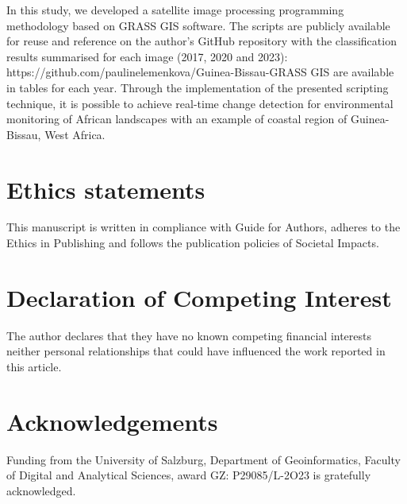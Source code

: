 \documentclass[final,5p,times,twocolumn]{elsarticle}
\begin{document}
In this study, we developed a satellite image processing programming methodology based on GRASS GIS software. The scripts are publicly available for reuse and reference on the author's GitHub repository with the classification results summarised for each image (2017, 2020 and 2023): https://github.com/paulinelemenkova/Guinea-Bissau-GRASS GIS are available in tables for each year. Through the implementation of the presented scripting technique, it is possible to achieve real-time change detection for environmental monitoring of African landscapes with an example of coastal region of Guinea-Bissau, West Africa.

\section{Ethics statements}

This manuscript is written in compliance with Guide for Authors, adheres to the Ethics in Publishing and follows the publication policies of Societal Impacts.

\section{Declaration of Competing Interest}

The author declares that they have no known competing financial interests neither personal relationships that could have influenced the work reported in this article.

\section{Acknowledgements}
Funding from the University of Salzburg, Department of Geoinformatics, Faculty of Digital and Analytical Sciences, award GZ: P29085/L-2O23 is gratefully acknowledged.

\appendix

 


\end{document}
